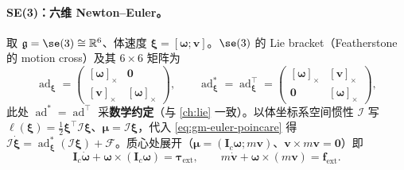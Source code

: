 \paragraph{SE(3)：六维 Newton--Euler。}
取 $\mathfrak g=\se(3)\cong\mathbb R^6$、体速度 $\boldsymbol\xi=[\boldsymbol\omega;\mathbf v]$。$\se(3)$ 的 Lie bracket（Featherstone 的 motion cross）及其 $6\times6$ 矩阵为
\begin{equation}
  \operatorname{ad}_{\boldsymbol\xi}=\begin{pmatrix}[\boldsymbol\omega]_\times & \mathbf0\\ [\mathbf v]_\times & [\boldsymbol\omega]_\times\end{pmatrix},\qquad
  \operatorname{ad}^*_{\boldsymbol\xi}=\operatorname{ad}_{\boldsymbol\xi}^\top=\begin{pmatrix}[\boldsymbol\omega]_\times & [\mathbf v]_\times\\ \mathbf0 & [\boldsymbol\omega]_\times\end{pmatrix},
  \label{eq:gm-ad-se3}
\end{equation}
此处 $\operatorname{ad}^*=\operatorname{ad}^\top$ 采\textbf{数学约定}（与 \cref{ch:lie} 一致）。以体坐标系空间惯性 $\boldsymbol{\mathcal I}$ 写 $\ell(\boldsymbol\xi)=\tfrac12\boldsymbol\xi^\top\boldsymbol{\mathcal I}\boldsymbol\xi$、$\boldsymbol\mu=\boldsymbol{\mathcal I}\boldsymbol\xi$，代入 \cref{eq:gm-euler-poincare} 得 $\boldsymbol{\mathcal I}\dot{\boldsymbol\xi}=\operatorname{ad}^*_{\boldsymbol\xi}(\boldsymbol{\mathcal I}\boldsymbol\xi)+\boldsymbol{\mathcal F}$。质心处展开（$\boldsymbol\mu=(\mathbf I_c\boldsymbol\omega;m\mathbf v)$、$\mathbf v\times m\mathbf v=\mathbf0$）即
\begin{equation}
  \mathbf I_c\dot{\boldsymbol\omega}+\boldsymbol\omega\times(\mathbf I_c\boldsymbol\omega)=\boldsymbol\tau_{\mathrm{ext}},\qquad
  m\dot{\mathbf v}+\boldsymbol\omega\times(m\mathbf v)=\mathbf f_{\mathrm{ext}}.
  \label{eq:gm-se3-newton-euler}
\end{equation}

